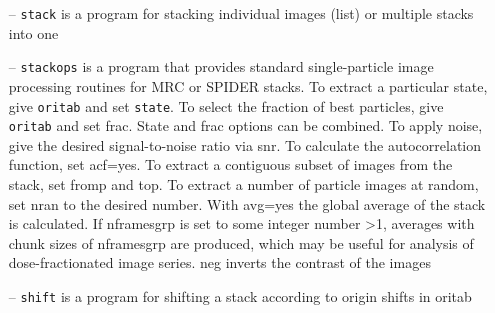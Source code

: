 \documentclass[a4paper,11pt]{article}
\newcommand{\prgname}[1]{\textcolor{NavyBlue}{\texttt{#1}}}
\begin{document}
\begin{itemize}
\item[--] \prgname{stack} is a program for stacking individual images (list) or multiple stacks into one
\item[--] \prgname{stackops} is a program that provides standard single-particle image processing routines for MRC or SPIDER stacks. To extract a particular state, give \texttt{oritab} and set \texttt{state}. To select the fraction of best particles, give \texttt{oritab} and set frac. State and frac options can be combined. To apply noise, give the desired signal-to-noise ratio via snr. To calculate the autocorrelation function, set acf=yes. To extract a contiguous subset of images from the stack, set fromp and top. To extract a number of particle images at random, set nran to the desired number. With avg=yes the global average of the stack is calculated. If nframesgrp is set to some integer number >1, averages with chunk sizes of nframesgrp are produced, which may be useful for analysis of dose-fractionated image series. neg inverts the contrast of the images
\item[--] \prgname{shift} is a program for shifting a stack according to origin shifts in oritab
\end{itemize}
\end{document}
